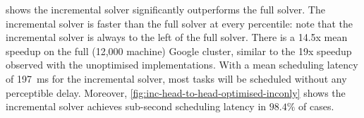  shows the incremental solver significantly outperforms the full solver. The incremental solver is faster than the full solver at every percentile: note that the incremental solver is always to the left of the full solver. There is a 14.5x mean speedup on the full (12,000 machine) Google cluster, similar to the 19x speedup observed with the unoptimised implementations\footnotemark. With a mean scheduling latency of \SI{197}{\milli\second} for the incremental solver, most tasks will be scheduled without any perceptible delay. Moreover, \cref{fig:inc-head-to-head-optimised-inconly} shows the incremental solver achieves sub-second scheduling latency in $98.4\%$ of cases.


%
%
%
%
%
%
%
%
%
%

